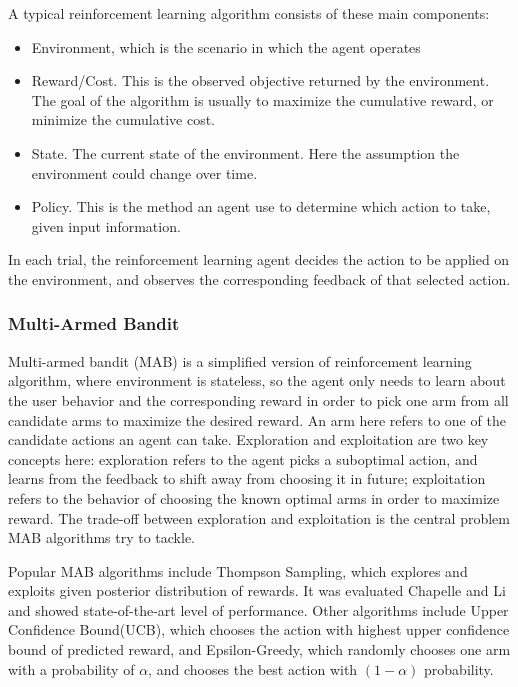 \documentclass[conference]{IEEEtran}
\begin{document}
A typical reinforcement learning algorithm consists of these main components: 
\begin{itemize}
    \item Environment, which is the scenario in which the agent operates
    \item Reward/Cost. This is the observed objective returned by the environment. The goal of the algorithm is usually to maximize the cumulative reward, or minimize the cumulative cost.
    \item State. The current state of the environment. Here the assumption the environment could change over time.
    \item Policy. This is the method an agent use to determine which action to take, given input information.
\end{itemize}

In each trial, the reinforcement learning agent decides the action to be applied on the environment, and observes the corresponding feedback of that selected action.

\subsubsection{Multi-Armed Bandit}

Multi-armed bandit (MAB) is a simplified version of reinforcement learning algorithm, where environment is stateless, so the agent only needs to learn about the user behavior and the corresponding reward in order to pick one arm from all candidate arms to maximize the desired reward. An arm here refers to one of the candidate actions an agent can take. Exploration and exploitation are two key concepts here: exploration refers to the agent picks a suboptimal action, and learns from the feedback to shift away from choosing it in future; exploitation refers to the behavior of choosing the known optimal arms in order to maximize reward. The trade-off between exploration and exploitation is the central problem MAB algorithms try to tackle.

Popular MAB algorithms include Thompson Sampling, which explores and exploits given posterior distribution of rewards. It was evaluated Chapelle and Li\cite{NIPS2011_e53a0a29} and showed state-of-the-art level of performance. Other algorithms include Upper Confidence Bound(UCB), which chooses the action with highest upper confidence bound of predicted reward, and Epsilon-Greedy, which randomly chooses one arm with a probability of \(\alpha\), and chooses the best action with \((1-\alpha)\) probability.
\end{document}
